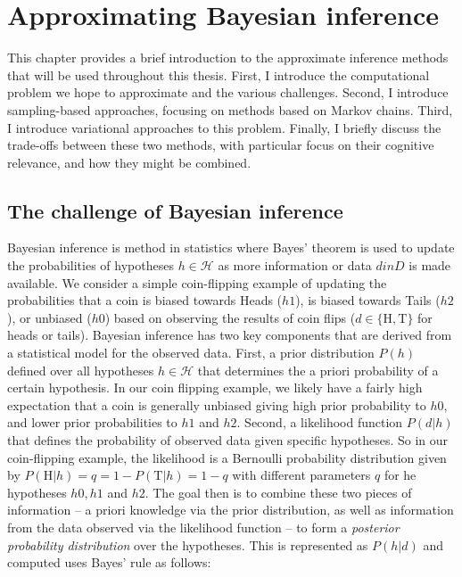 
\chapter{Approximating Bayesian inference}

This chapter provides a brief introduction to the approximate inference methods that will be used throughout this thesis. First, I introduce the computational problem we hope to approximate and the various challenges. Second, I introduce sampling-based approaches, focusing on methods based on Markov chains. Third, I introduce variational approaches to this problem. Finally, I briefly discuss the trade-offs between these two methods, with particular focus on their cognitive relevance, and how they might be combined.

\section{The challenge of Bayesian inference}
Bayesian inference is method in statistics where Bayes' theorem is used to update the probabilities of hypotheses $h \in \mathcal{H}$ as more information or data $d in D$ is made available. We consider a simple coin-flipping example of updating the probabilities that a coin is biased towards Heads ($h1$), is biased towards Tails ($h2$), or unbiased ($h0$) based on observing the results of coin flips ($d \in \{\text{H}, \text{T}\}$ for heads or tails). Bayesian inference has two key components that are derived from a statistical model for the observed data. First, a prior distribution $P(h)$ defined over all hypotheses $h \in \mathcal{H}$ that determines the a priori probability of a certain hypothesis. In our coin flipping example, we likely have a fairly high expectation that a coin is generally unbiased giving high prior probability to $h0$, and lower prior probabilities to $h1$ and $h2$. Second, a likelihood function $P(d | h)$ that defines the probability of observed data given specific hypotheses. So in our coin-flipping example, the likelihood is a Bernoulli probability distribution given by $P(\text{H} | h) = q = 1 - P(\text{T} | h) = 1- q$ with different parameters $q$ for he hypotheses $h0, h1$ and $h2$. The goal then is to combine these two pieces of information -- a priori knowledge via the prior distribution, as well as information from the data observed via the likelihood function -- to form a \textit{posterior probability distribution} over the hypotheses. This is represented as $P(h | d)$ and computed uses Bayes' rule as follows:

